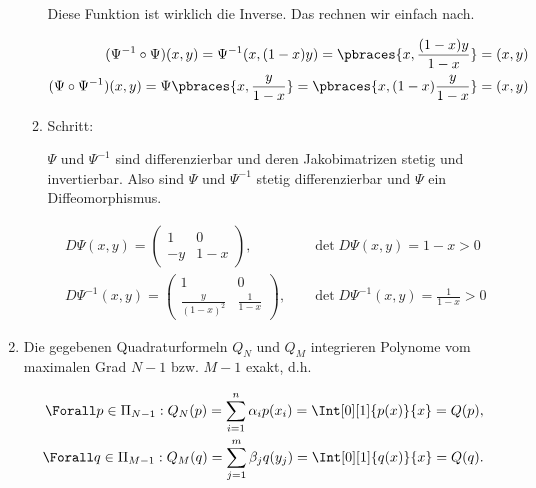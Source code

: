 \begin{solution}
\begin{enumerate}[label = \textbf{\alph*)}]
\begin{enumerate}[label = \arabic*.]
      Diese Funktion ist wirklich die Inverse.
      Das rechnen wir einfach nach.

      \begin{align*}
        (\Psi^{-1} \circ \Psi)(x, y)
        =
        \Psi^{-1}(x, (1 - x) y)
        =
        \pbraces{x, \frac{(1 - x) y}{1 - x}}
        =
        (x, y) \\
        (\Psi \circ \Psi^{-1})(x, y)
        =
        \Psi \pbraces{x, \frac{y}{1 - x}}
        =
        \pbraces{x, (1 - x) \frac{y}{1 - x}}
        =
        (x, y)
      \end{align*}

      \item Schritt:

      $\Psi$ und $\Psi^{-1}$ sind differenzierbar und deren Jakobimatrizen stetig und invertierbar.
      Also sind $\Psi$ und $\Psi^{-1}$ stetig differenzierbar und $\Psi$ ein Diffeomorphismus.

      \begin{align*}
        D \Psi(x, y)
        =
        \begin{pmatrix}
          1  & 0 \\
          -y & 1 - x
        \end{pmatrix},
        & \quad
        \det D \Psi(x, y) = 1 - x > 0 \\
        D \Psi^{-1}(x, y)
        =
        \begin{pmatrix}
          1                   & 0 \\
          \frac{y}{(1 - x)^2} & \frac{1}{1 - x}
        \end{pmatrix},
        & \quad
        \det D \Psi^{-1}(x, y) = \frac{1}{1 - x} > 0
      \end{align*}

    \end{enumerate}


    \item Die gegebenen Quadraturformeln $Q_N$ und $Q_M$ integrieren Polynome vom maximalen Grad $N - 1$ bzw. $M - 1$ exakt, d.h.

    \begin{align*}
      \Forall p \in \Pi_{N - 1}:
      Q_N(p)
      =
      \sum_{i = 1}^n \alpha_i p(x_i)
      =
      \Int[0][1]{p(x)}{x}
      =
      Q(p), \\
      \Forall q \in \Pi_{M - 1}:
      Q_M(q)
      =
      \sum_{j = 1}^m \beta_j q(y_j)
      =
      \Int[0][1]{q(x)}{x}
      =
      Q(q).
    \end{align*}


\end{enumerate}
\end{solution}
